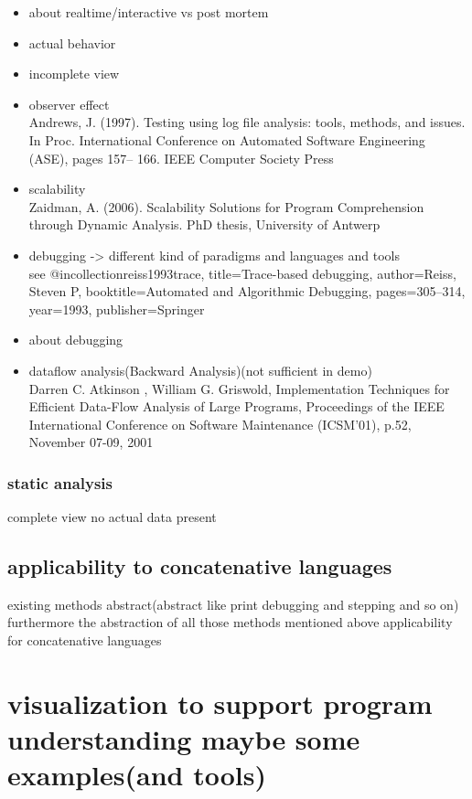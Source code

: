 \begin{itemize}
\item about realtime/interactive vs post mortem
\item actual behavior
\item incomplete view \cite{Ball:1999:CDA:318774.318944}
\item observer effect \\
Andrews, J. (1997). Testing using log file analysis: tools, methods, and issues.
In Proc. International Conference on Automated Software Engineering (ASE), pages 157–
166. IEEE Computer Society Press
\item scalability \\
Zaidman, A. (2006). Scalability Solutions for Program Comprehension through Dynamic
Analysis. PhD thesis, University of Antwerp
\item debugging -> different kind of paradigms and languages and tools\\
see @incollection{reiss1993trace,
title={Trace-based debugging},
author={Reiss, Steven P},
booktitle={Automated and Algorithmic Debugging},
pages={305--314},
year={1993},
publisher={Springer}
}
\item about debugging
\item dataflow analysis(Backward Analysis)(not sufficient in demo) \\
	Darren C. Atkinson , William G. Griswold, Implementation Techniques for Efficient Data-Flow Analysis of Large Programs, Proceedings of the IEEE International Conference on Software Maintenance (ICSM'01), p.52, November 07-09, 2001
\end{itemize}

\subsubsection{static analysis}

complete view
no actual data present

\subsection{applicability to concatenative languages}

existing methods abstract(abstract like print debugging and stepping and so on) furthermore the abstraction of all those methods mentioned above
applicability for concatenative languages

\section{visualization to support program understanding maybe some examples(and tools)}


